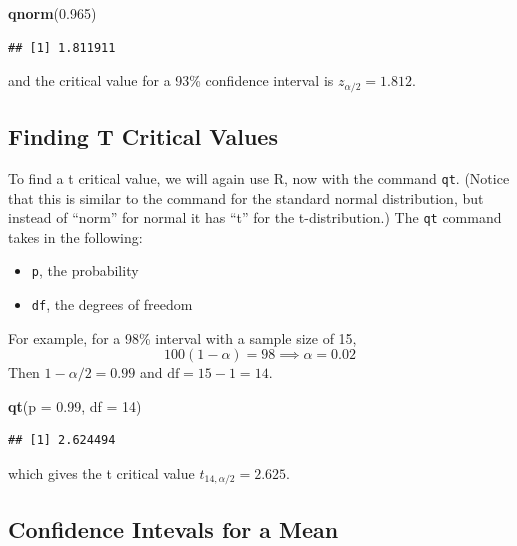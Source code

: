 \documentclass[
]{book}
\newenvironment{Shaded}{\begin{snugshade}}{\end{snugshade}}
\newcommand{\AttributeTok}[1]{\textcolor[rgb]{0.13,0.29,0.53}{#1}}
\newcommand{\DecValTok}[1]{\textcolor[rgb]{0.00,0.00,0.81}{#1}}
\newcommand{\FloatTok}[1]{\textcolor[rgb]{0.00,0.00,0.81}{#1}}
\newcommand{\FunctionTok}[1]{\textcolor[rgb]{0.13,0.29,0.53}{\textbf{#1}}}
\newcommand{\NormalTok}[1]{#1}
\providecommand{\tightlist}{%
  \setlength{\itemsep}{0pt}\setlength{\parskip}{0pt}}
\begin{document}
\begin{Shaded}
\begin{Highlighting}[]
\FunctionTok{qnorm}\NormalTok{(}\FloatTok{0.965}\NormalTok{)}
\end{Highlighting}
\end{Shaded}

\begin{verbatim}
## [1] 1.811911
\end{verbatim}

and the critical value for a 93\% confidence interval is \(z_{\alpha/2}=1.812\).

\subsection*{Finding T Critical Values}\label{finding-t-critical-values}

To find a t critical value, we will again use R, now with the command \texttt{qt}. (Notice that this is similar to the command for the standard normal distribution, but instead of ``norm'' for normal it has ``t'' for the t-distribution.) The \texttt{qt} command takes in the following:

\begin{itemize}
\tightlist
\item
  \texttt{p}, the probability
\item
  \texttt{df}, the degrees of freedom
\end{itemize}

For example, for a 98\% interval with a sample size of 15, \[100(1-\alpha) = 98 \implies \alpha=0.02\] Then \(1-\alpha/2 = 0.99\) and \(\text{df}=15-1=14\).

\begin{Shaded}
\begin{Highlighting}[]
\FunctionTok{qt}\NormalTok{(}\AttributeTok{p =} \FloatTok{0.99}\NormalTok{, }\AttributeTok{df =} \DecValTok{14}\NormalTok{)}
\end{Highlighting}
\end{Shaded}

\begin{verbatim}
## [1] 2.624494
\end{verbatim}

which gives the t critical value \(t_{14,\alpha/2} = 2.625\).

\subsection*{Confidence Intevals for a Mean}\label{confidence-intevals-for-a-mean}
\end{document}
